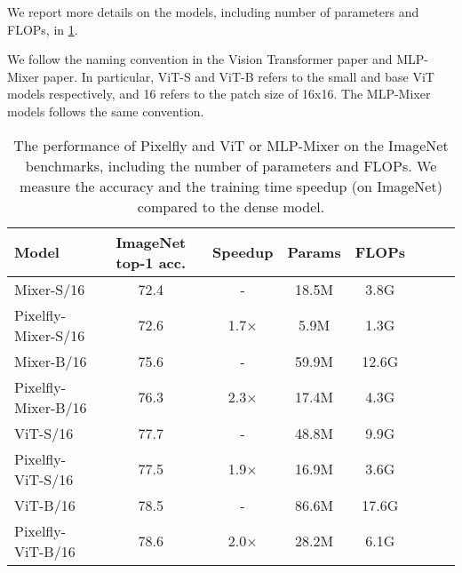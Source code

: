 \begin{table}[!htbp]
    
\centering
{}
\caption{Configuration of the ImageNet experiment}
\label{table:}
\end{table}

We report more details on the models, including number of parameters and FLOPs, in \cref{table:flops_imagenet}.

We follow the naming convention in the Vision Transformer paper and MLP-Mixer paper. In particular, ViT-S and ViT-B refers to the small and base ViT models respectively, and 16 refers to the patch size of 16x16. The MLP-Mixer models follows the same convention.

\begin{table}[h]
\centering
\caption{\label{table:flops_imagenet}The performance of Pixelfly and ViT or MLP-Mixer on the ImageNet benchmarks, including the number of parameters and FLOPs. We measure the accuracy and the training time speedup (on ImageNet) compared to the dense model.}
\begin{tabular}{@{}lccccccc@{}}
Model&\multicolumn{1}{c}{ImageNet top-1 acc.}&\multicolumn{1}{c}{Speedup} &\multicolumn{1}{c}{Params} & \multicolumn{1}{c}{FLOPs} \\
\midrule
Mixer-S/16& 72.4& - & 18.5M & 3.8G \\
Pixelfly-Mixer-S/16& 72.6& 1.7$\times$ & 5.9M & 1.3G \\
Mixer-B/16& 75.6& - & 59.9M & 12.6G \\
Pixelfly-Mixer-B/16& 76.3& 2.3$\times$ & 17.4M & 4.3G \\
\midrule
ViT-S/16& 77.7 & - & 48.8M & 9.9G \\
Pixelfly-ViT-S/16& 77.5 & 1.9$\times$ & 16.9M & 3.6G \\
ViT-B/16& 78.5 & - & 86.6M  & 17.6G \\
Pixelfly-ViT-B/16& 78.6 & 2.0$\times$ & 28.2M & 6.1G \\
\bottomrule
\end{tabular}
\end{table}



